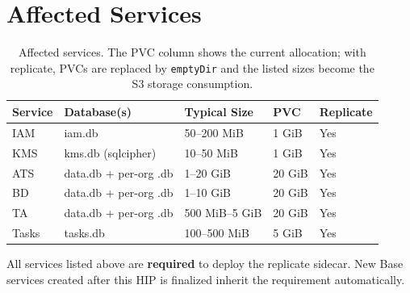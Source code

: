 \section{Affected Services}


\begin{table}[H]
\centering
\begin{tabular}{@{}lllll@{}}
\toprule
\textbf{Service} & \textbf{Database(s)} & \textbf{Typical Size} & \textbf{PVC} & \textbf{Replicate} \\
\midrule
IAM     & iam.db                    & 50--200 MiB   & 1 GiB  & Yes \\
KMS     & kms.db (sqlcipher)        & 10--50 MiB    & 1 GiB  & Yes \\
ATS     & data.db + per-org .db     & 1--20 GiB     & 20 GiB & Yes \\
BD      & data.db + per-org .db     & 1--10 GiB     & 20 GiB & Yes \\
TA      & data.db + per-org .db     & 500 MiB--5 GiB & 20 GiB & Yes \\
Tasks   & tasks.db                  & 100--500 MiB  & 5 GiB  & Yes \\
\bottomrule
\end{tabular}
\caption{Affected services. The PVC column shows the current allocation; with
replicate, PVCs are replaced by \texttt{emptyDir} and the listed sizes
become the S3 storage consumption.}
\label{tab:services}
\end{table}

All services listed above are \textbf{required} to deploy the replicate
sidecar. New Base services created after this HIP is finalized inherit the
requirement automatically.

